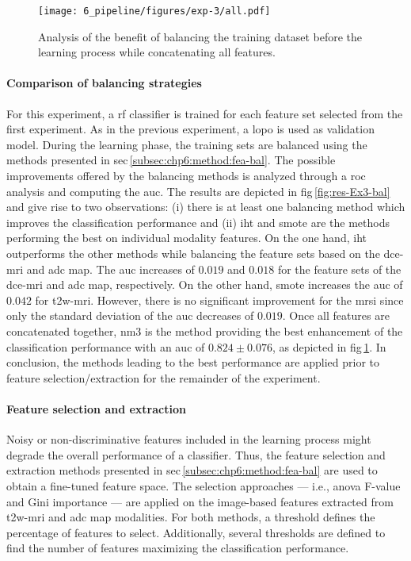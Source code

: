 \begin{figure}
  \centering
  \texttt{[image: 6\_pipeline/figures/exp-3/all.pdf]}
  \caption{Analysis of the benefit of balancing the training dataset before the learning process while concatenating all features.}
  \label{fig:allbalance}
\end{figure}

\paragraph{Comparison of balancing strategies}
For this experiment, a \ac{rf} classifier is trained for each feature set selected from the first experiment.
As in the previous experiment, a \ac{lopo} is used as validation model.
During the learning phase, the training sets are balanced using the methods presented in \acs{sec}\,\ref{subsec:chp6:method:fea-bal}.
The possible improvements offered by the balancing methods is analyzed through a \ac{roc} analysis and computing the \ac{auc}.
The results are depicted in \acs{fig}\,\ref{fig:res-Ex3-bal} and give rise to two observations:
(i) there is at least one balancing method which improves the classification performance and
(ii) \ac{iht} and \ac{smote} are the methods performing the best on individual modality features.
On the one hand, \ac{iht} outperforms the other methods while balancing the feature sets based on the \ac{dce}-\ac{mri} and \ac{adc} map.
The \ac{auc} increases of $0.019$ and $0.018$ for the feature sets of the \ac{dce}-\ac{mri} and \ac{adc} map, respectively.
On the other hand, \ac{smote} increases the \ac{auc} of $0.042$ for \ac{t2w}-\ac{mri}.
However, there is no significant improvement for the \ac{mrsi} since only the standard deviation of the \ac{auc} decreases of $0.019$.
Once all features are concatenated together, \ac{nm3} is the method providing the best enhancement of the classification performance with an \ac{auc} of $0.824 \pm 0.076$, as depicted in \acs{fig}\,\ref{fig:allbalance}.
In conclusion, the methods leading to the best performance are applied prior to feature selection/extraction for the remainder of the experiment.

\paragraph{Feature selection and extraction}

Noisy or non-discriminative features included in the learning process might degrade the overall performance of a classifier.
Thus, the feature selection and extraction methods presented in \acs{sec}\,\ref{subsec:chp6:method:fea-bal} are used to obtain a fine-tuned feature space.
The selection approaches --- i.e., \ac{anova} F-value and Gini importance --- are applied on the image-based features extracted from \ac{t2w}-\ac{mri} and \ac{adc} map modalities.
For both methods, a threshold defines the percentage of features to select.
Additionally, several thresholds are defined to find the number of features maximizing the classification performance.

